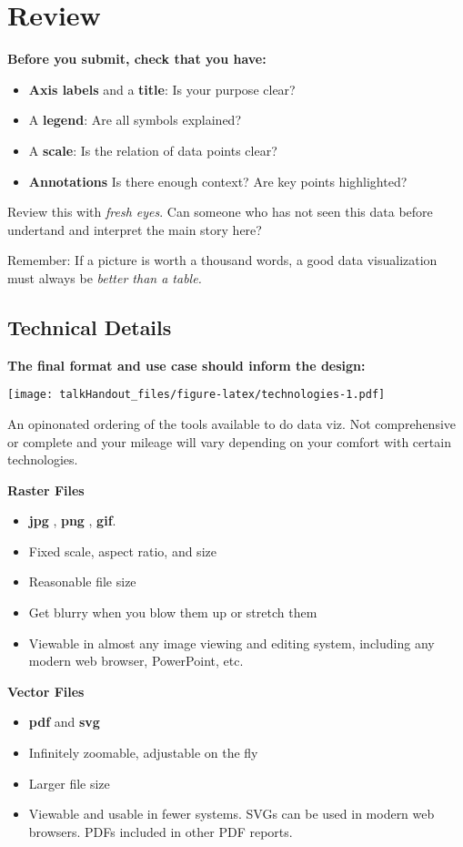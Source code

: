 \documentclass{tufte-handout}
\begin{document}
\section{Review}\label{review}

\textbf{Before you submit, check that you have:}

\begin{itemize}
\itemsep1pt\parskip0pt
\item
  \textbf{Axis labels} and a \textbf{title}: Is your purpose clear?
\item
  A \textbf{legend}: Are all symbols explained?
\item
  A \textbf{scale}: Is the relation of data points clear?
\item
  \textbf{Annotations} Is there enough context? Are key points
  highlighted?
\end{itemize}

Review this with \emph{fresh eyes}. Can someone who has not seen this
data before undertand and interpret the main story here?

Remember: If a picture is worth a thousand words, a good data
visualization must always be \emph{better than a table.}

\subsection{Technical Details}\label{technical-details}

\textbf{The final format and use case should inform the design:}

\begin{marginfigure}
 \texttt{[image: talkHandout\_files/figure-latex/technologies-1.pdf]}
\caption{An opinonated ordering of the tools available to do data viz. Not comprehensive or complete and your mileage will vary depending on your comfort with certain technologies.}
\end{marginfigure}

\textbf{Raster Files}

\begin{itemize}
\itemsep1pt\parskip0pt
\item
  \textbf{jpg} , \textbf{png} , \textbf{gif}.
\item
  Fixed scale, aspect ratio, and size
\item
  Reasonable file size
\item
  Get blurry when you blow them up or stretch them
\item
  Viewable in almost any image viewing and editing system, including any
  modern web browser, PowerPoint, etc.
\end{itemize}

\textbf{Vector Files}

\begin{itemize}
\itemsep1pt\parskip0pt
\item
  \textbf{pdf} and \textbf{svg}
\item
  Infinitely zoomable, adjustable on the fly
\item
  Larger file size
\item
  Viewable and usable in fewer systems. SVGs can be used in modern web
  browsers. PDFs included in other PDF reports.
\end{itemize}
\end{document}
